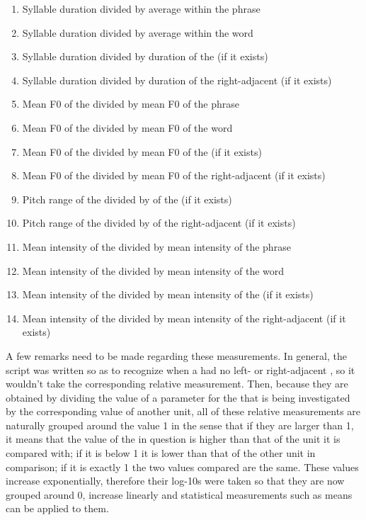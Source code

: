 \documentclass[output=paper]{LSP/langsci}
\begin{document}
\begin{enumerate}
\item  Syllable duration divided by average  within the phrase
\item  Syllable duration divided by average  within the word
\item  Syllable duration divided by duration of the  (if it exists)
\item  Syllable duration divided by duration of the right-adjacent  (if it exists)
\item  Mean F0 of the  divided by mean F0 of the phrase
\item  Mean F0 of the  divided by mean F0 of the word
\item  Mean F0 of the  divided by mean F0 of the  (if it exists)
\item  Mean F0 of the  divided by mean F0 of the right-adjacent  (if it exists)
\item  Pitch range of the  divided by  of the  (if it exists)
\item  Pitch range of the  divided by  of the right-adjacent  (if it exists)
\item  Mean intensity of the  divided by mean intensity of the phrase
\item  Mean intensity of the  divided by mean intensity of the word
\item  Mean intensity of the  divided by mean intensity of the  (if it exists)
\item  Mean intensity of the  divided by mean intensity of the right-ad\-ja\-cent  (if it exists)
\end{enumerate}

A few remarks need to be made regarding these measurements. In general, the script was written so as to recognize when a  had no left- or right-adjacent , so it wouldn’t take the corresponding relative measurement. Then, because they are obtained by dividing the value of a parameter for the  that is being investigated by the corresponding value of another unit, all of these relative measurements are naturally grouped around the value 1 in the sense that if they are larger than 1, it means that the value of the  in question is higher than that of the unit it is compared with; if it is below 1 it is lower than that of the other unit in comparison; if it is exactly 1 the two values compared are the same. These values increase exponentially, therefore their log-10s were taken so that they are now grouped around 0, increase linearly and statistical measurements such as means can be applied to them. 
\end{document}
